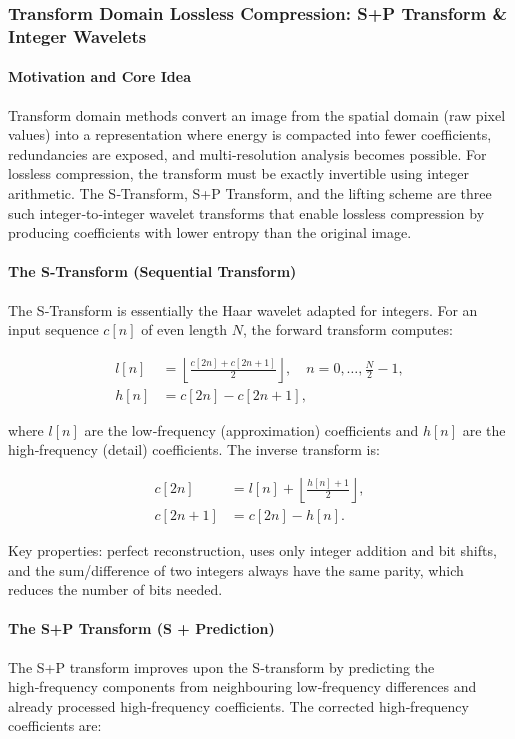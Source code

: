 \subsubsection{Transform Domain Lossless Compression: S+P Transform \& Integer Wavelets}

\paragraph{Motivation and Core Idea}
Transform domain methods convert an image from the spatial domain (raw pixel values) into a representation where energy is compacted into fewer coefficients, redundancies are exposed, and multi‑resolution analysis becomes possible. For lossless compression, the transform must be exactly invertible using integer arithmetic. The S‑Transform, S+P Transform, and the lifting scheme are three such integer‑to‑integer wavelet transforms that enable lossless compression by producing coefficients with lower entropy than the original image.

\paragraph{The S‑Transform (Sequential Transform)}
The S‑Transform is essentially the Haar wavelet adapted for integers. For an input sequence \(c[n]\) of even length \(N\), the forward transform computes:

\[
\begin{aligned}
l[n] &= \left\lfloor \frac{c[2n] + c[2n+1]}{2} \right\rfloor, \quad n = 0,\ldots,\frac{N}{2}-1,\\
h[n] &= c[2n] - c[2n+1],
\end{aligned} 
\]

where \(l[n]\) are the low‑frequency (approximation) coefficients and \(h[n]\) are the high‑frequency (detail) coefficients. The inverse transform is:

\[
\begin{aligned}
c[2n] &= l[n] + \left\lfloor \frac{h[n] + 1}{2} \right\rfloor,\\
c[2n+1] &= c[2n] - h[n].
\end{aligned} 
\]

Key properties: perfect reconstruction, uses only integer addition and bit shifts, and the sum/difference of two integers always have the same parity, which reduces the number of bits needed.

\paragraph{The S+P Transform (S + Prediction)}
The S+P transform improves upon the S‑transform by predicting the high‑frequency components from neighbouring low‑frequency differences and already processed high‑frequency coefficients. The corrected high‑frequency coefficients are:

